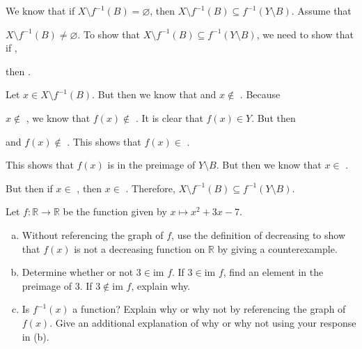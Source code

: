 \documentclass[11pt,letterpaper]{article}
\begin{document}
 We know that if $X \setminus f^{-1}(B)= \varnothing$, then $X \setminus f^{-1}(B) \subseteq f^{-1}(Y \setminus B)$. Assume that \pspace

$X \setminus f^{-1}(B)\neq \varnothing$. To show that $X \setminus f^{-1}(B) \subseteq f^{-1}(Y \setminus B)$, we need to show that if \underline{\hspace{3cm}}, \pspace

then \underline{\hspace{3cm}}. \pvspace{0.7cm}

Let $x \in X \setminus f^{-1}(B)$. But then we know that \underline{\hspace{3cm}} and $x \notin$ \underline{\hspace{3cm}}. Because \pspace

$x \notin$ \underline{\hspace{3cm}}, we know that $f(x) \notin$ \underline{\hspace{3cm}}. It is clear that $f(x) \in Y$. But then \pspace

\underline{\hspace{3cm}} and $f(x) \notin$ \underline{\hspace{3cm}}. This shows that $f(x) \in$ \underline{\hspace{3cm}}. \pspace

This shows that $f(x)$ is in the preimage of $Y \setminus B$. But then we know that $x \in$ \underline{\hspace{3cm}}. \pspace

But then if $x \in$ \underline{\hspace{3cm}}, then $x \in$ \underline{\hspace{3cm}}. Therefore, $X \setminus f^{-1}(B) \subseteq f^{-1}(Y \setminus B)$.



\newpage



 Let $f: \mathbb{R} \to \mathbb{R}$ be the function given by $x \mapsto x^2 + 3x - 7$. 
	\begin{enumerate}[(a)]
	\item Without referencing the graph of $f$, use the definition of decreasing to show that $f(x)$ is not a decreasing function on $\mathbb{R}$ by giving a counterexample. 
	\item Determine whether or not $3 \in \text{im } f$. If $3 \in \text{im } f$, find an element in the preimage of 3. If $3 \notin \text{im } f$, explain why. 
	\item Is $f^{-1}(x)$ a function? Explain why or why not by referencing the graph of $f(x)$. Give an additional explanation of why or why not using your response in (b). 
	\end{enumerate}
\end{document}
